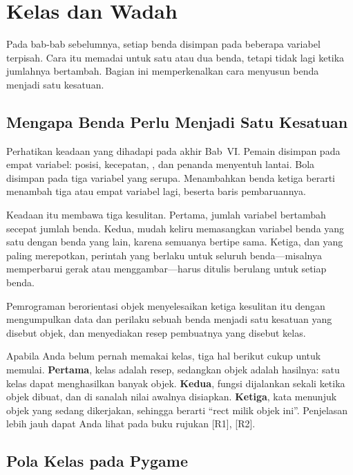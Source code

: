\section{Kelas  dan Wadah }
\label{sec:kelas-sprite}

Pada bab-bab sebelumnya, setiap benda disimpan pada beberapa variabel
terpisah. Cara itu memadai untuk satu atau dua benda, tetapi tidak lagi ketika
jumlahnya bertambah. Bagian ini memperkenalkan cara menyusun benda menjadi satu
kesatuan.

\subsection{Mengapa Benda Perlu Menjadi Satu Kesatuan}

Perhatikan keadaan yang dihadapi pada akhir Bab~VI. Pemain disimpan pada empat
variabel: posisi, kecepatan, , dan penanda menyentuh lantai. Bola
disimpan pada tiga variabel yang serupa. Menambahkan benda ketiga berarti
menambah tiga atau empat variabel lagi, beserta baris pembaruannya.

Keadaan itu membawa tiga kesulitan. Pertama, jumlah variabel bertambah secepat
jumlah benda. Kedua, mudah keliru memasangkan variabel benda yang satu dengan
benda yang lain, karena semuanya bertipe sama. Ketiga, dan yang paling
merepotkan, perintah yang berlaku untuk seluruh benda---misalnya memperbarui
gerak atau menggambar---harus ditulis berulang untuk setiap benda.

Pemrograman berorientasi objek menyelesaikan ketiga kesulitan itu dengan
mengumpulkan data dan perilaku sebuah benda menjadi satu kesatuan yang disebut
objek, dan menyediakan resep pembuatnya yang disebut kelas.

\begin{catatabox}
Apabila Anda belum pernah memakai kelas, tiga hal berikut cukup untuk memulai.
\textbf{Pertama}, kelas adalah resep, sedangkan objek adalah hasilnya: satu
kelas dapat menghasilkan banyak objek. \textbf{Kedua}, fungsi
 dijalankan sekali ketika objek dibuat, dan di sanalah nilai
awalnya disiapkan. \textbf{Ketiga}, kata  menunjuk objek yang sedang
dikerjakan, sehingga  berarti ``rect milik objek ini''.
Penjelasan lebih jauh dapat Anda lihat pada buku rujukan \mbox{[R1]},
\mbox{[R2]}.
\end{catatabox}

\subsection{Pola Kelas  pada Pygame}

